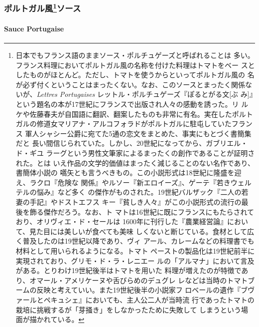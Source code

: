 \begin{recette}
\maeaki

\hypertarget{ux30ddux30ebux30c8ux30acux30ebux98a873ux30bdux30fcux30b9}{%
\subsubsection[ポルトガル風ソース]{\texorpdfstring{ポルトガル風\footnote{日本でもフランス語のままソース・ポルチュゲーズと呼ばれることは
  多い。フランス料理においてポルトガル風の名称を付けた料理はトマトをベー
  スとしたものがほとんど。ただし、トマトを使うからといってポルトガル風の
  名が必ず付くということはまったくない。なお、このソースとまったく関係な
  いが、\emph{Lettres Portugaises}
  レットル・ポルチュゲーズ『ぽるとがる文{[}ぶ
  み{]}』という題名の本が17世紀にフランスで出版され人々の感動を誘った。リ
  ルケや佐藤春夫が自国語に翻訳、翻案したものも非常に有名。実在したポルト
  ガルの修道女マリアナ・アルコフォラドがポルトガルに駐屯していたフランス
  軍人シャシー公爵に宛てた5通の恋文をまとめた、事実にもとづく書簡集だと
  長い間信じられていた。しかし、20世紀になってから、ガブリエル・ド・ギユ
  ラーグという男性文筆家によるまったくの創作であることが証明された。とは
  いえ作品の文学的価値はまったく減じることのない名作であり、書簡体小説の
  嚆矢とも言うべきもの。この小説形式は18世紀に隆盛を迎え、ラクロ『危険な
  関係』やルソー『新エロイーズ』、ゲーテ『若きウェルテルの悩み』など多く
  の傑作がものされた。19世紀バルザック『二人の若妻の手記』やドストエフス
  キー『貧しき人々』がこの小説形式の流行の最後を飾る傑作だろう。なお、ト
  マトは16世紀に既にフランスにもたらされており、オリヴィエ・ド・セールは
  1600年に刊行した『農業経営論』において、見た目には美しいが食べても美味
  しくないと断じている。食材として広く普及したのは19世紀以降であり、ヴィ
  アール、カレームなどの料理書でも材料として用いられるようになる。トマト
  ペーストの製品化は19世紀前半に実現されており、グリモ・ド・ラ・レニエー
  ルの「アルマナ」において言及がある。とりわけ19世紀後半はトマトを用いた
  料理が増えたのが特徴であり、オマール・アメリケーヌや舌びらめのデュグレ
  レなどは当時のトマトブームの反映と考えていい。また19世紀後半の小説家フ
  ロベールの遺作『ブヴァールとペキュシェ』においても、主人公二人が当時流
  行であったトマトの栽培に挑戦するが「芽掻き」をしなかったために失敗して
  しまうという場面が描かれている。}ソース}{ポルトガル風ソース}}\label{ux30ddux30ebux30c8ux30acux30ebux98a873ux30bdux30fcux30b9}}

\hypertarget{sauce-portugaise}{%
\paragraph{Sauce Portugaise}\label{sauce-portugaise}}


\end{recette}
